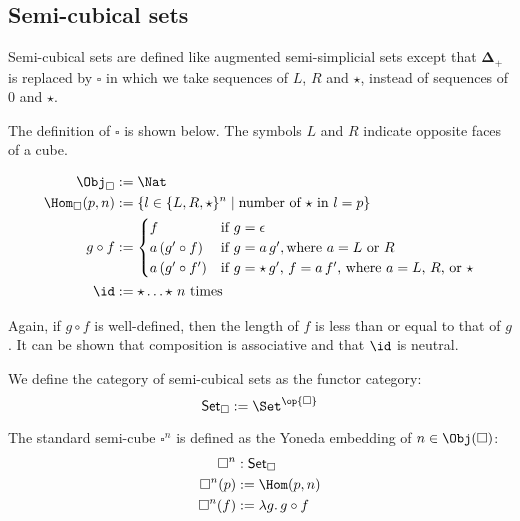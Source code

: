 \documentclass{art.cls/art}
\newcommand{\DeltaPlus}{\ensuremath{\boldsymbol{\Delta}_+}}
\newcommand{\Cube}{\ensuremath{\boldsymbol{{\square}}}}
\newcommand{\CSet}{\ensuremath{\mathsf{Set}_{\boldsymbol{\square}}}}
\newcommand{\kstar}{{\star}}
\begin{document}
\subsection*{Semi-cubical sets}
Semi-cubical sets are defined like augmented semi-simplicial sets except that $\DeltaPlus$ is replaced by $\Cube$ in which we take sequences of $L$, $R$ and $\kstar$, instead of sequences of $0$ and $\kstar$.

\begin{definition}[\Cube]
  The definition of $\Cube$ is shown below. The symbols $L$ and $R$ indicate opposite faces of a cube.

  \begin{align*}
    \Obj_{\Cube}       & := \Nat                                                                   \\
    \Hom_{\Cube}(p, n) & := \{l \in \{L, R, \kstar\}^n \mid \text{number of $\kstar$ in $l = p$}\} \\
    g \circ f          & :=
    \begin{cases}
      f                & \text{if $g = \epsilon$}                                                 \\
      a\,(g' \circ f)  & \text{if $g = a\,g'$}, \text{where $a = L$ or $R$}                       \\
      a\,(g' \circ f') & \text{if $g = \kstar\,g'$, $f = a\,f'$, where $a = L$, $R$, or $\kstar$} \\
    \end{cases}    \\
    \id                & := \kstar \ldots \kstar \text{ $n$ times}
  \end{align*}

  Again, if $g \circ f$ is well-defined, then the length of $f$ is less than or equal to that of $g$. It can be shown that composition is associative and that $\id$ is neutral.
\end{definition}

\begin{definition}[\CSet]
  We define the category of semi-cubical sets as the functor category:
  \begin{equation*}
    \CSet := \Set^{\op{\Cube}}
  \end{equation*}
\end{definition}

\begin{definition}[$\Cube^n$]
  The standard semi-cube $\Cube^n$ is defined as the Yoneda embedding of $n \in \Obj(\Cube)$:
  \begin{align*}
    \Cube^n    & : \CSet                    \\
    \Cube^n(p) & := \Hom(p, n)              \\
    \Cube^n(f) & := \lambda g .\, g \circ f
  \end{align*}
\end{definition}
\end{document}
